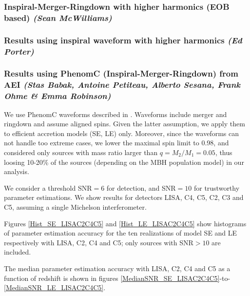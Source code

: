 \documentclass{iopart}
\begin{document}
\subsubsection{Inspiral-Merger-Ringdown with higher harmonics (EOB based)  {\it (Sean McWilliams)}}
\label{SSS:MBHbPEPhenomAEI}



\subsubsection{Results using inspiral waveform with higher harmonics  {\it (Ed Porter)}}
\label{SSS:MBHbPEInspHHEd}




\subsubsection{Results using PhenomC (Inspiral-Merger-Ringdown) from AEI {\it (Stas Babak, Antoine Petiteau, Alberto Sesana, Frank Ohme \& Emma Robinson)}}
\label{SSS:MBHbPEPhenomAEI}
We use PhenomC waveforms described in \cite{Santamaria:2010yb}. Waveforms include merger and ringdown and assume aligned spins. Given the latter assumption, we apply them to efficient accretion models (SE, LE) only. Moreover, since the waveforms can not handle too extreme cases, we lower the maximal spin limit to 0.98, and considered only sources with mass ratio larger than $q=M_2/M_1=0.05$, thus loosing 10-20\% of the sources (depending on the MBH population model) in our analysis.

We consider a threshold SNR$=6$ for detection, and SNR$=10$ for trustworthy parameter estimations. We show results for detectors LISA, C4, C5, C2, C3 and C5,  assuming a single Michelson interferometer. 


Figures \ref{Hist_SE_LISAC2C4C5} and \ref{Hist_LE_LISAC2C4C5} show histograms of parameter estimation accuracy for the ten realizations of model SE and LE respectively with LISA, C2, C4 and C5; only sources with SNR$>10$ are included. 

The median parameter estimation accuracy with LISA, C2, C4 and C5 as a function of redshift is shown in figures \ref{MedianSNR_SE_LISAC2C4C5}-to-\ref{MedianSNR_LE_LISAC2C4C5}.
\end{document}
